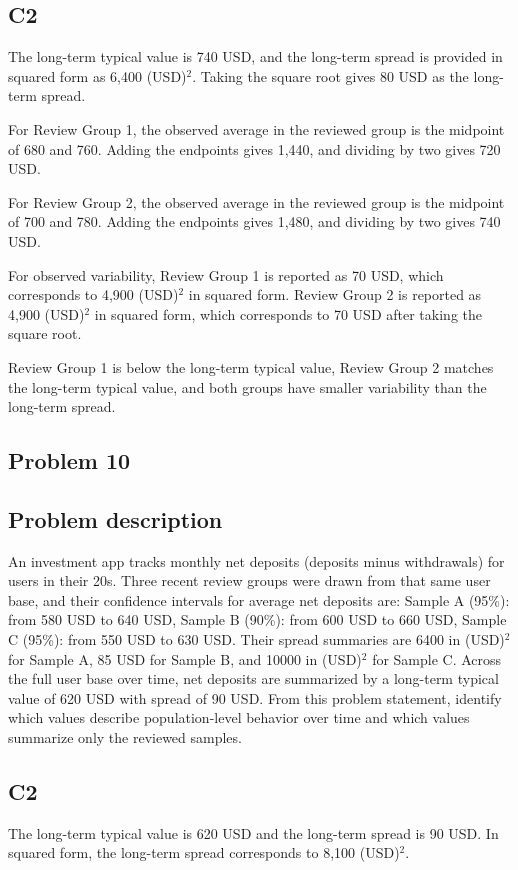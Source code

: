 \begin{ExamProblems}
\subsection*{C2}
		The long-term typical value is 740 USD, and the long-term spread is provided in squared form as 6,400 (USD)$^2$.
		Taking the square root gives 80 USD as the long-term spread.

		For Review Group 1, the observed average in the reviewed group is the midpoint of 680 and 760.
		Adding the endpoints gives 1,440, and dividing by two gives 720 USD.

		For Review Group 2, the observed average in the reviewed group is the midpoint of 700 and 780.
		Adding the endpoints gives 1,480, and dividing by two gives 740 USD.

		For observed variability, Review Group 1 is reported as 70 USD, which corresponds to 4,900 (USD)$^2$ in squared form.
		Review Group 2 is reported as 4,900 (USD)$^2$ in squared form, which corresponds to 70 USD after taking the square root.

		Review Group 1 is below the long-term typical value, Review Group 2 matches the long-term typical value, and both groups have smaller variability than the long-term spread.


		\newpage
		\item
		\subsection*{Problem 10}
		\subsection*{Problem description}
		An investment app tracks monthly net deposits (deposits minus withdrawals) for users in their 20s.
		Three recent review groups were drawn from that same user base, and their confidence intervals for average net deposits are:
		Sample A (95\%): from 580 USD to 640 USD,
		Sample B (90\%): from 600 USD to 660 USD,
		Sample C (95\%): from 550 USD to 630 USD.
		Their spread summaries are 6400 in (USD)$^2$ for Sample A, 85 USD for Sample B, and 10000 in (USD)$^2$ for Sample C.
		Across the full user base over time, net deposits are summarized by a long-term typical value of 620 USD with spread of 90 USD.
		From this problem statement, identify which values describe population-level behavior over time and which values summarize only the reviewed samples.

\subsection*{C2}
		The long-term typical value is 620 USD and the long-term spread is 90 USD.
		In squared form, the long-term spread corresponds to 8,100 (USD)$^2$.


\end{ExamProblems}
